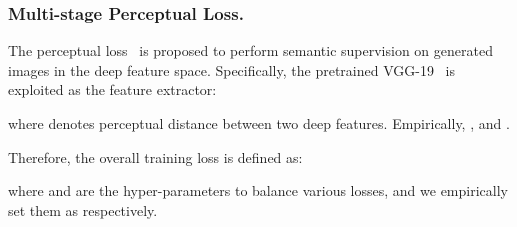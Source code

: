 \subsubsection{Multi-stage Perceptual Loss.} The perceptual loss~\cite{johnson2016perceptual} is proposed to perform semantic supervision on generated images in the deep feature space. Specifically, the pretrained VGG-19~\cite{simonyan2014very} is exploited as the feature extractor:
\begin{small}

\end{small}
where  denotes perceptual distance between two deep features. Empirically, ,  and .

Therefore, the overall training loss is defined as:

where  and  are the hyper-parameters to balance various losses, and we empirically set them as  respectively.



